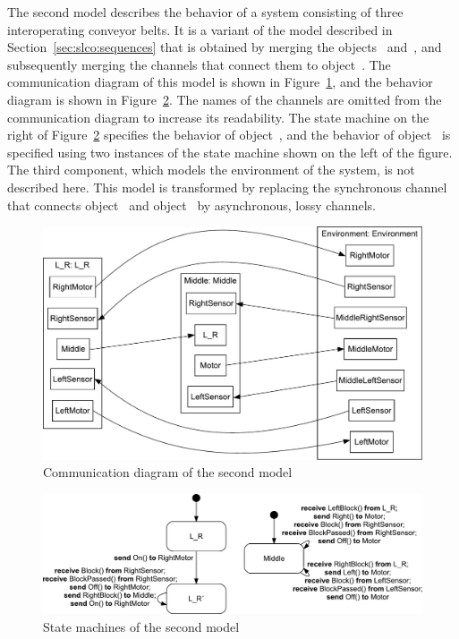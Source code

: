 The second model describes the behavior of a system consisting of three interoperating conveyor belts.
It is a variant of the model described in Section~\ref{sec:slco:sequences} that is obtained by merging the objects~ and~, and subsequently merging the channels that connect them to object~.
The communication diagram of this model is shown in Figure~\ref{fig:exploring-boundaries:conveyor-merge-communication}, and the behavior diagram is shown in Figure~\ref{fig:exploring-boundaries:conveyor-merged-sms}.
The names of the channels are omitted from the communication diagram to increase its readability.
The state machine on the right of Figure~\ref{fig:exploring-boundaries:conveyor-merged-sms} specifies the behavior of object~, and the behavior of object~ is specified using two instances of the state machine shown on the left of the figure.
The third component, which models the environment of the system, is not described here.
This model is transformed by replacing the synchronous channel that connects object~ and object~ by asynchronous, lossy channels.

\begin{figure}[hbt]
 \centering
 \includegraphics[scale=0.45]{exploring-boundaries/figs/ConveyorExampleCommunicationMerged}
 \caption{Communication diagram of the second model}
 \label{fig:exploring-boundaries:conveyor-merge-communication}
\end{figure}

\begin{figure}[hbt]
 \centering
 \includegraphics[scale=0.45]{exploring-boundaries/figs/ConveyorExampleSMSMerge}
 \caption{State machines of the second model}
 \label{fig:exploring-boundaries:conveyor-merged-sms}
\end{figure}

